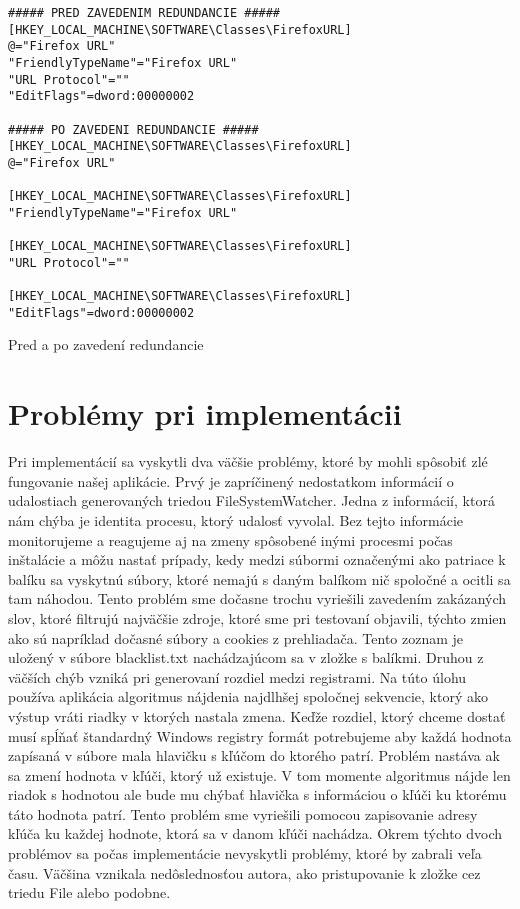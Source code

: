 \begin{listing}
\begin{verbatim}  
##### PRED ZAVEDENIM REDUNDANCIE #####
[HKEY_LOCAL_MACHINE\SOFTWARE\Classes\FirefoxURL]
@="Firefox URL"
"FriendlyTypeName"="Firefox URL"
"URL Protocol"=""
"EditFlags"=dword:00000002

##### PO ZAVEDENI REDUNDANCIE #####
[HKEY_LOCAL_MACHINE\SOFTWARE\Classes\FirefoxURL]
@="Firefox URL"

[HKEY_LOCAL_MACHINE\SOFTWARE\Classes\FirefoxURL]
"FriendlyTypeName"="Firefox URL"

[HKEY_LOCAL_MACHINE\SOFTWARE\Classes\FirefoxURL]
"URL Protocol"=""

[HKEY_LOCAL_MACHINE\SOFTWARE\Classes\FirefoxURL]
"EditFlags"=dword:00000002
\end{verbatim}
\caption{Pred a po zavedení redundancie}
\label{lst:redunexample}
\end{listing}

\section{Problémy pri implementácii}
Pri implementácií sa vyskytli dva väčšie problémy, ktoré by mohli spôsobiť zlé fungovanie našej aplikácie. Prvý je zapríčinený nedostatkom informácií o udalostiach generovaných triedou FileSystemWatcher. Jedna z informácií, ktorá nám chýba je identita procesu, ktorý udalosť vyvolal. Bez tejto informácie monitorujeme a reagujeme aj na zmeny spôsobené inými procesmi počas inštalácie a môžu nastať prípady, kedy medzi súbormi označenými ako patriace k balíku sa vyskytnú súbory, ktoré  nemajú s daným balíkom nič spoločné a ocitli sa tam náhodou. Tento problém sme dočasne trochu vyriešili zavedením zakázaných slov, ktoré filtrujú najväčšie zdroje, ktoré sme pri testovaní objavili, týchto zmien ako sú napríklad dočasné súbory a cookies z prehliadača. Tento zoznam je uložený v súbore blacklist.txt nachádzajúcom sa v zložke s balíkmi.
Druhou z väčších chýb vzniká pri generovaní rozdiel medzi registrami. Na túto úlohu používa aplikácia algoritmus nájdenia najdlhšej spoločnej sekvencie, ktorý ako výstup vráti riadky v ktorých nastala zmena. Keďže rozdiel, ktorý chceme dostať musí spĺňať štandardný Windows registry formát potrebujeme aby každá hodnota zapísaná v súbore mala hlavičku s kľúčom do ktorého patrí. Problém nastáva ak sa zmení hodnota v kľúči, ktorý už existuje. V tom momente algoritmus nájde len riadok s hodnotou ale bude mu chýbať hlavička s informáciou o kľúči ku ktorému táto hodnota patrí. Tento problém sme vyriešili pomocou zapisovanie adresy kľúča ku každej hodnote, ktorá sa v danom kľúči nachádza. Okrem týchto dvoch problémov sa počas implementácie nevyskytli problémy, ktoré by zabrali veľa času. Väčšina vznikala nedôslednosťou autora, ako pristupovanie k zložke cez triedu File alebo podobne.

